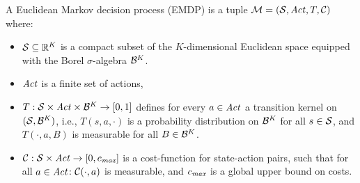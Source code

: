\documentclass{llncs}
\begin{document}
\begin{definition}\label{def:mdp}
  A      Euclidean Markov decision process        (EMDP)
  is              a              tuple
  $\mathcal{M}=(\mathcal{S}, \mathit{Act}, T, \mathcal{C})$ where:
\begin{itemize}
\item $\mathcal{S} \subseteq  \mathbb{R}^K$ is a
 compact subset of the $K$-dimensional Euclidean space equipped with the Borel $\sigma$-algebra
  $\mathcal{B}^K$. 
\item $\mathit{Act}$ is a finite set of actions,
\item    $T:\mathcal{S}    \times   \mathit{Act}  \times\mathcal{B}^K \rightarrow[0,1]$ defines for every $a\in\mathit{Act}$ a
  transition kernel on $(\mathcal{S},\mathcal{B}^K)$,
  i.e., $T(s,a,\cdot)$ is a probability distribution on $\mathcal{B}^K$ for all
  $s\in\mathcal{S}$, and $T(\cdot,a,B)$ is measurable for all $B\in\mathcal{B}^K$.
\item  $\mathcal{C}:\mathcal{S}\times\mathit{Act}\rightarrow[0,c_{\emph{max}}]$   is  a
  cost-function for state-action pairs, such that for all $a\in\mathit{Act}$:
  $\mathcal{C}(\cdot,a)$ is measurable, and $c_{\emph{max}}$ is a global upper bound on costs.
\end{itemize}
\end{definition}
\end{document}
